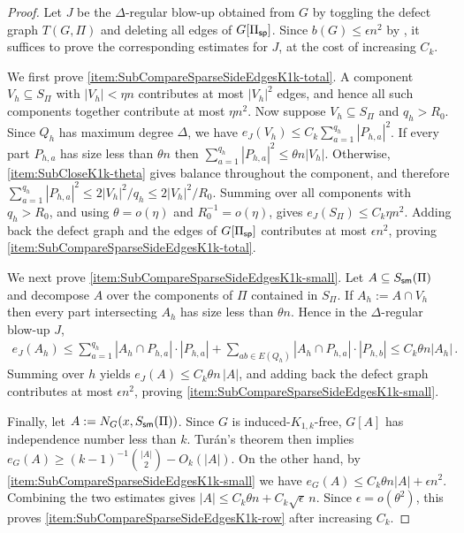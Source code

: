 \begin{proof}
Let $J$ be the $\Delta$-regular blow-up obtained from $G$ by toggling the defect graph $T(G,\Pi)$ and deleting all edges of $G[\Pi_{\mathsf{sp}}]$. Since $b(G)\leq\epsilon n^2$ by , it suffices to prove the corresponding estimates for $J$, at the cost of increasing $C_k$.

We first prove \ref{item:SubCompareSparseSideEdgesK1k-total}. A component $V_h\subseteq S_\Pi$ with $|V_h|<\eta n$ contributes at most $|V_h|^2$ edges, and hence all such components together contribute at most $\eta n^2$. Now suppose $V_h\subseteq S_\Pi$ and $q_h>R_0$. Since $Q_h$ has maximum degree $\Delta$, we have $e_J(V_h)\leq C_k\sum_{a=1}^{q_h}|P_{h,a}|^2$. If every part $P_{h,a}$ has size less than $\theta n$ then $\sum_{a=1}^{q_h}|P_{h,a}|^2\leq \theta n|V_h|$. Otherwise,  \ref{item:SubCloseK1k-theta} gives balance throughout the component, and therefore $\sum_{a=1}^{q_h}|P_{h,a}|^2\leq 2|V_h|^2/q_h\leq 2|V_h|^2/R_0$.
Summing over all components with $q_h>R_0$, and using $\theta=o(\eta)$ and $R_0^{-1}=o(\eta)$, gives $e_J(S_\Pi)\leq C_k\eta n^2$. Adding back the defect graph and the edges of $G[\Pi_{\mathsf{sp}}]$ contributes at most $\epsilon n^2$, proving \ref{item:SubCompareSparseSideEdgesK1k-total}.

We next prove \ref{item:SubCompareSparseSideEdgesK1k-small}. Let $A\subseteq S_{\mathsf{sm}}(\Pi)$ and decompose $A$ over the components of $\Pi$ contained in $S_\Pi$. If $A_h:=A\cap V_h$ then every part intersecting $A_h$ has size less than $\theta n$. Hence in the $\Delta$-regular blow-up $J$,
\begin{align*}
e_J(A_h) \leq \sum_{a=1}^{q_h}|A_h\cap P_{h,a}|\cdot|P_{h,a}|+\sum_{ab\in E(Q_h)}|A_h\cap P_{h,a}|\cdot|P_{h,b}| \leq C_k\theta n|A_h|\,.
\end{align*}
Summing over $h$ yields $e_J(A)\leq C_k\theta n\,|A|$, and adding back the defect graph contributes at most $\epsilon n^2$, proving \ref{item:SubCompareSparseSideEdgesK1k-small}.

Finally, let $A:=N_G(x,S_{\mathsf{sm}}(\Pi))$. Since $G$ is induced-$K_{1,k}$-free, $G[A]$ has independence number less than $k$. Tur\'an's theorem then implies $e_G(A)\geq (k-1)^{-1}\binom{|A|}{2}-O_k(|A|)$. On the other hand, by \ref{item:SubCompareSparseSideEdgesK1k-small} we have $e_G(A)\leq C_k\theta n|A|+\epsilon n^2$. Combining the two estimates gives $|A|\leq C_k\theta n+C_k\sqrt{\epsilon}\,n$.
Since $\epsilon=o(\theta^2)$, this proves \ref{item:SubCompareSparseSideEdgesK1k-row} after increasing $C_k$.
\end{proof}


